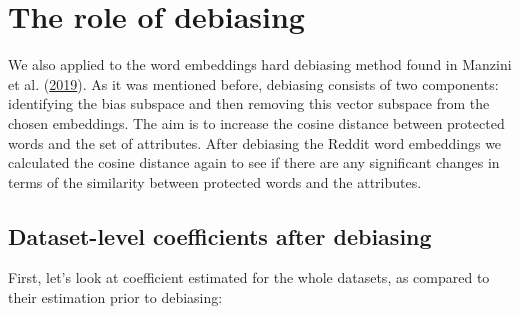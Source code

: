 \documentclass[12pt,]{book}
\begin{document}
\chapter{The role of debiasing}\label{the-role-of-debiasing}

We also applied to the word embeddings hard debiasing method found in
Manzini et al.
(\protect\hyperlink{ref-Manzini2019blackToCriminal}{2019}). As it was
mentioned before, debiasing consists of two components: identifying the
bias subspace and then removing this vector subspace from the chosen
embeddings. The aim is to increase the cosine distance between protected
words and the set of attributes. After debiasing the Reddit word
embeddings we calculated the cosine distance again to see if there are
any significant changes in terms of the similarity between protected
words and the attributes.

\section{Dataset-level coefficients after
debiasing}\label{dataset-level-coefficients-after-debiasing}

First, let's look at coefficient estimated for the whole datasets, as
compared to their estimation prior to debiasing:
\end{document}
